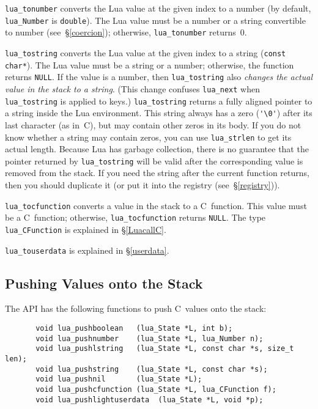 \documentclass[11pt,twoside]{article}
\makeatletter
\newcommand{\See}[1]{\S\ref{#1}}
\newcommand{\see}[1]{(see~\See{#1})}
\newcommand{\DefAPI}[1]{\index{C API!#1@{\tt #1}}}
\makeatother
\begin{document}
\verb|lua_tonumber| converts the Lua value at the given index
to a number (by default, \verb|lua_Number| is \verb|double|).
\DefAPI{lua_Number}
The Lua value must be a number or a string convertible to number
\see{coercion}; otherwise, \verb|lua_tonumber| returns~0.

\verb|lua_tostring| converts the Lua value at the given index to a string
(\verb|const char*|).
The Lua value must be a string or a number;
otherwise, the function returns \verb|NULL|.
If the value is a number,
then \verb|lua_tostring| also
\emph{changes the actual value in the stack to a string}.
(This change confuses \verb|lua_next|
when \verb|lua_tostring| is applied to keys.)
\verb|lua_tostring| returns a fully aligned pointer
to a string inside the Lua environment.
This string always has a zero (\verb|'\0'|)
after its last character (as in~C),
but may contain other zeros in its body.
If you do not know whether a string may contain zeros,
you can use \verb|lua_strlen| to get its actual length.
Because Lua has garbage collection,
there is no guarantee that the pointer returned by \verb|lua_tostring|
will be valid after the corresponding value is removed from the stack.
If you need the string after the current function returns,
then you should duplicate it (or put it into the registry \see{registry}).

\verb|lua_tocfunction| converts a value in the stack to a C~function.
This value must be a C~function;
otherwise, \verb|lua_tocfunction| returns \verb|NULL|.
The type \verb|lua_CFunction| is explained in \See{LuacallC}.

\verb|lua_touserdata| is explained in \See{userdata}.


\subsection{Pushing Values onto the Stack}

The API has the following functions to
push C~values onto the stack:
\begin{verbatim}
       void lua_pushboolean   (lua_State *L, int b);
       void lua_pushnumber    (lua_State *L, lua_Number n);
       void lua_pushlstring   (lua_State *L, const char *s, size_t len);
       void lua_pushstring    (lua_State *L, const char *s);
       void lua_pushnil       (lua_State *L);
       void lua_pushcfunction (lua_State *L, lua_CFunction f);
       void lua_pushlightuserdata  (lua_State *L, void *p);
\end{verbatim}
\end{document}

